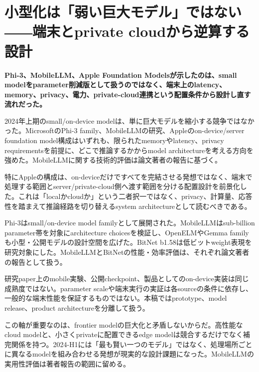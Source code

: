 \section{小型化は「弱い巨大モデル」ではない――端末とprivate cloudから逆算する設計}
\noindent\textbf{Phi-3、MobileLLM、Apple Foundation Modelsが示したのは、small modelをparameter削減版として扱うのではなく、端末上のlatency、memory、privacy、電力、private-cloud連携という配置条件から設計し直す流れだった。}\autocite{src-86ea660dfc62,src-c89d38f0e830,src-e78721484043}

2024年上期のsmall/on-device modelは、単に巨大モデルを縮小する競争ではなかった。MicrosoftのPhi-3 family、MobileLLMの研究、Appleのon-device/server foundation model構成はいずれも、限られたmemoryやlatency、privacy requirementsを前提に、どこで推論するかからmodel architectureを考える方向を強めた。MobileLLMに関する技術的評価は論文著者の報告に基づく。\autocite{src-86ea660dfc62,src-c89d38f0e830,src-e78721484043}


特にAppleの構成は、on-deviceだけですべてを完結させる発想ではなく、端末で処理する範囲とserver/private-cloud側へ渡す範囲を分ける配置設計を前景化した。これは「localかcloudか」という二者択一ではなく、privacy、計算量、応答性を踏まえて推論経路を切り替えるsystem architectureとして読むべきである。\autocite{src-c89d38f0e830}


Phi-3はsmall/on-device model familyとして展開された。MobileLLMはsub-billion parameter帯を対象にarchitecture choicesを検証し、OpenELMやGemma familyも小型・公開モデルの設計空間を広げた。BitNet b1.58は低ビットweight表現を研究対象にした。MobileLLMとBitNetの性能・効率評価は、それぞれ論文著者の報告として扱う。\autocite{src-0395647db4a8,src-4d404eabda6e,src-86ea660dfc62,src-e78721484043,src-fb3cf48135e8}


\begin{claimboundary}
研究paper上のmobile実験、公開checkpoint、製品としてのon-device実装は同じ成熟度ではない。parameter scaleや端末実行の実証は各sourceの条件に依存し、一般的な端末性能を保証するものではない。本稿ではprototype、model release、product architectureを分離して扱う。\autocite{src-556c0edcf39c,src-86ea660dfc62,src-c89d38f0e830,src-e78721484043}
\end{claimboundary}

この軸が重要なのは、frontier modelの巨大化と矛盾しないからだ。高性能なcloud modelと、小さくprivateに配置できるedge modelは競合するだけでなく補完関係を持つ。2024-H1には「最も賢い一つのモデル」ではなく、処理場所ごとに異なるmodelを組み合わせる発想が現実的な設計課題になった。MobileLLMの実用性評価は著者報告の範囲に留める。\autocite{src-86ea660dfc62,src-c89d38f0e830,src-e78721484043}
